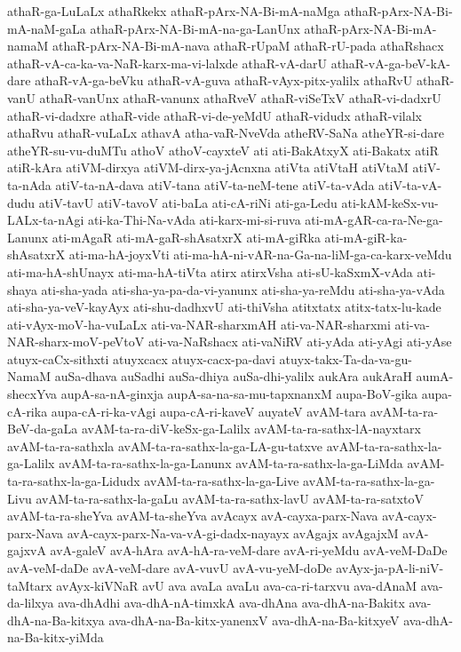 {athaR-ga-LuLaLx
athaRkekx
athaR-pArx-NA-Bi-mA-naMga
athaR-pArx-NA-Bi-mA-naM-gaLa
athaR-pArx-NA-Bi-mA-na-ga-LanUnx
athaR-pArx-NA-Bi-mA-namaM
athaR-pArx-NA-Bi-mA-nava
athaR-rUpaM
athaR-rU-pada
athaRshacx
athaR-vA-ca-ka-va-NaR-karx-ma-vi-lalxde
athaR-vA-darU
athaR-vA-ga-beV-kA-dare
athaR-vA-ga-beVku
athaR-vA-guva
athaR-vAyx-pitx-yalilx
athaRvU
athaR-vanU
athaR-vanUnx
athaR-vanunx
athaRveV
athaR-viSeTxV
athaR-vi-dadxrU
athaR-vi-dadxre
athaR-vide
athaR-vi-de-yeMdU
athaR-vidudx
athaR-vilalx
athaRvu
athaR-vuLaLx
athavA
atha-vaR-NveVda
atheRV-SaNa
atheYR-si-dare
atheYR-su-vu-duMTu
athoV
athoV-cayxteV
ati
ati-BakAtxyX
ati-Bakatx
atiR
atiR-kAra
atiVM-dirxya
atiVM-dirx-ya-jAcnxna
atiVta
atiVtaH
atiVtaM
atiV-ta-nAda
atiV-ta-nA-dava
atiV-tana
atiV-ta-neM-tene
atiV-ta-vAda
atiV-ta-vA-dudu
atiV-tavU
atiV-tavoV
ati-baLa
ati-cA-riNi
ati-ga-Ledu
ati-kAM-keSx-vu-LALx-ta-nAgi
ati-ka-Thi-Na-vAda
ati-karx-mi-si-ruva
ati-mA-gAR-ca-ra-Ne-ga-Lanunx
ati-mAgaR
ati-mA-gaR-shAsatxrX
ati-mA-giRka
ati-mA-giR-ka-shAsatxrX
ati-ma-hA-joyxVti
ati-ma-hA-ni-vAR-na-Ga-na-liM-ga-ca-karx-veMdu
ati-ma-hA-shUnayx
ati-ma-hA-tiVta
atirx
atirxVsha
ati-sU-kaSxmX-vAda
ati-shaya
ati-sha-yada
ati-sha-ya-pa-da-vi-yanunx
ati-sha-ya-reMdu
ati-sha-ya-vAda
ati-sha-ya-veV-kayAyx
ati-shu-dadhxvU
ati-thiVsha
atitxtatx
atitx-tatx-lu-kade
ati-vAyx-moV-ha-vuLaLx
ati-va-NAR-sharxmAH
ati-va-NAR-sharxmi
ati-va-NAR-sharx-moV-peVtoV
ati-va-NaRshacx
ati-vaNiRV
ati-yAda
ati-yAgi
ati-yAse
atuyx-caCx-sithxti
atuyxcacx
atuyx-cacx-pa-davi
atuyx-takx-Ta-da-va-gu-NamaM
auSa-dhava
auSadhi
auSa-dhiya
auSa-dhi-yalilx
aukAra
aukAraH
aumA-shecxYva
aupA-sa-nA-ginxja
aupA-sa-na-sa-mu-tapxnanxM
aupa-BoV-gika
aupa-cA-rika
aupa-cA-ri-ka-vAgi
aupa-cA-ri-kaveV
auyateV
avAM-tara
avAM-ta-ra-BeV-da-gaLa
avAM-ta-ra-diV-keSx-ga-Lalilx
avAM-ta-ra-sathx-lA-nayxtarx
avAM-ta-ra-sathxla
avAM-ta-ra-sathx-la-ga-LA-gu-tatxve
avAM-ta-ra-sathx-la-ga-Lalilx
avAM-ta-ra-sathx-la-ga-Lanunx
avAM-ta-ra-sathx-la-ga-LiMda
avAM-ta-ra-sathx-la-ga-Lidudx
avAM-ta-ra-sathx-la-ga-Live
avAM-ta-ra-sathx-la-ga-Livu
avAM-ta-ra-sathx-la-gaLu
avAM-ta-ra-sathx-lavU
avAM-ta-ra-satxtoV
avAM-ta-ra-sheYva
avAM-ta-sheYva
avAcayx
avA-cayxa-parx-Nava
avA-cayx-parx-Nava
avA-cayx-parx-Na-va-vA-gi-dadx-nayayx
avAgajx
avAgajxM
avA-gajxvA
avA-galeV
avA-hAra
avA-hA-ra-veM-dare
avA-ri-yeMdu
avA-veM-DaDe
avA-veM-daDe
avA-veM-dare
avA-vuvU
avA-vu-yeM-doDe
avAyx-ja-pA-li-niV-taMtarx
avAyx-kiVNaR
avU
ava
avaLa
avaLu
ava-ca-ri-tarxvu
ava-dAnaM
ava-da-lilxya
ava-dhAdhi
ava-dhA-nA-timxkA
ava-dhAna
ava-dhA-na-Bakitx
ava-dhA-na-Ba-kitxya
ava-dhA-na-Ba-kitx-yanenxV
ava-dhA-na-Ba-kitxyeV
ava-dhA-na-Ba-kitx-yiMda
}
